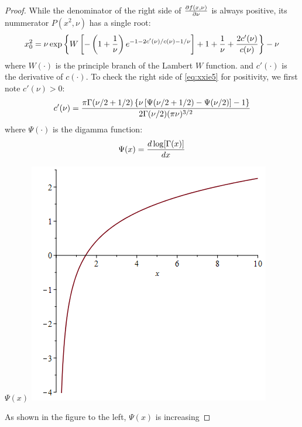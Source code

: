 \documentclass[11pt,a4]{amsart}
\newcommand{\pd}{\partial}
\newcommand{\1}{{\mathbf 1}}
\begin{document}
\begin{proof}
  While the denominator of the right side of ${\pd f(x, \nu) \over \pd \nu}$ is
  always positive, its nummerator $P(x^2, \nu)$ has a single root:
  \begin{equation}
    \label{eq:xxie5}
    x_0^2 = \nu\exp\left\{
      W\left[
        -\left(1 + {1 \over \nu}\right)
        e^{-1 - 2 c'(\nu)/c(\nu) - 1/\nu}
      \right]
      + 1 + {1 \over \nu} + {2 c'(\nu) \over c(\nu)}
    \right\} - \nu
  \end{equation}
  where $W(\cdot)$ is the principle branch of the Lambert $W$
  function. and $c'(\cdot)$ is the derivative of $c(\cdot)$. To check
  the right side of \eqref{eq:xxie5} for positivity, we first note
  $c'(\nu) > 0$:
  \[
  c'(\nu) = {
    \pi \Gamma(\nu/2 + 1/2) \left\{
      \nu \left[ \Psi(\nu/2 + 1/2) - \Psi(\nu/2)\right] - 1
    \right\}
    \over
    2 \Gamma(\nu/2) (\pi \nu)^{3/2}
  }
  \]
  where $\Psi(\cdot)$ is the digamma function:
  \[
  \Psi(x) = {d \log[\Gamma(x)] \over d x}
  \]
  \begin{minipage}{0.48\textwidth}
    $\Psi(x)$ \linebreak
    \includegraphics[width=\textwidth]{digamma.png}
  \end{minipage}\hfill
  \begin{minipage}{0.5\textwidth}
    As shown in the figure to the left, $\Psi(x)$ is increasing

\end{minipage}
\end{proof}
\end{document}
